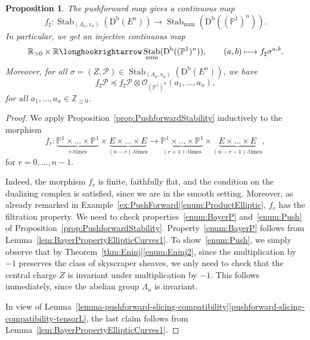 \documentclass[11pt, reqno]{amsart}
\numberwithin{equation}{section}
\theoremstyle{plain}
\newtheorem{proposition}[theorem]{Proposition}
\theoremstyle{remark}
\theoremstyle{definition}
\theoremstyle{italicsname}
\newcommand{\Db}{\mathrm{D^b}}
\DeclareMathOperator{\Stab}{Stab}
\newcommand{\cO}{\mathcal{O}}
\newcommand{\cP}{\mathscr{P}}
\def\RR{\ensuremath{\mathbb{R}}}
\def\ZZ{\ensuremath{\mathbb{Z}}}
\def\PP{\ensuremath{\mathbb{P}}}
\begin{document}
\begin{proposition}\label{prop:Elliptic2P1n}
The pushforward map gives a continuous map
\[
f_\sharp\colon\Stab_{(\Lambda_n,v_n)}(\Db(E^n))\longrightarrow\Stab_{\mathrm{num}}(\Db((\PP^1)^n)).
\]
In particular, we get an injective continuous map
\[
\RR_{>0}\times\RR\longhookrightarrow\Stab_{\mathrm{num}}(\Db((\PP^1)^n)),\qquad (a,b)\longmapsto f_\sharp\sigma^{a,b}.
\]
Moreover, for all $\sigma=(Z,\cP)\in\Stab_{(\Lambda_n,v_n)}(\Db(E^n))$, we have
\begin{equation}\label{eq:BayerPropertyP1n}
f_\sharp\cP\preceq f_\sharp\cP\otimes\cO_{(\PP^1)^n}(a_1,\dots,a_n),    
\end{equation}
for all $a_1,\dots,a_n\in\ZZ_{\geq0}$.
\end{proposition}

\begin{proof}
We apply Proposition~\ref{prop:PushforwardStability} inductively to the morphism
\[
f_r\colon\underbrace{\PP^1\times\dots\times\PP^1}_{r\text{-times}}\times\underbrace{E\times\dots\times E}_{(n-r)\text{-times}}\longrightarrow\underbrace{\PP^1\times\dots\times\PP^1}_{(r+1)\text{-times}}\times\underbrace{E\times\dots\times E}_{(n-r-1)\text{-times}},
\]
for $r=0,\dots,n-1$.

Indeed, the morphism $f_r$ is finite, faithfully flat, and the condition on the dualizing complex is satisfied, since we are in the smooth setting.
Moreover, as already remarked in Example~\ref{ex:PushForward}\eqref{enum:ProductElliptic}, $f_r$ has the filtration property.
We need to check properties~\ref{enum:BayerP} and~\ref{enum:Push} of Proposition~\ref{prop:PushforwardStability}.
Property~\ref{enum:BayerP} follows from Lemma~\ref{lem:BayerPropertyEllipticCurves1}.
To show~\ref{enum:Push}, we simply observe that by Theorem~\ref{thm:Eninj}\ref{enum:Eninj2}, since the multiplication by $-1$ preserves the class of skyscraper sheaves, we only need to check that the central charge $Z$ is invariant under multiplication by $-1$.
This follows immediately, since the abelian group $\Lambda_n$ is invariant.

In view of Lemma~\ref{lemma-pushforward-slicing-compatibility}\ref{pushforward-slicing-compatibility-tensorL}, the last claim follows from Lemma~\ref{lem:BayerPropertyEllipticCurves1}.
\end{proof}
\end{document}
